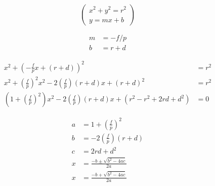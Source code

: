 \documentclass{article}
\begin{document}
\[ %
\begin{pmatrix}
x^2 + y^2 = r^2 \\
y = mx + b
\end{pmatrix}
\]

\[ %
\begin{aligned}
m &= -f/p \\
b &= r + d
\end{aligned}
\]

\[ %
\begin{aligned}
x^2 + \left(-\frac{f}{p}x + (r + d)\right)^2 &= r^2 \\
x^2 + \left(\frac{f}{p}\right)^2 x^2 - 2\left(\frac{f}{p}\right)(r + d)x +
  (r + d)^2 &= r^2 \\
\left(1 + \left(\frac{f}{p}\right)^2\right)x^2 -
  2\left(\frac{f}{p}\right)(r + d)x +
  (r^2 - r^2 + 2rd + d^2) &= 0
\end{aligned}
\]

\[ %
\begin{aligned}
a &= 1 + \left(\frac{f}{p}\right)^2 \\
b &= -2\left(\frac{f}{p}\right)(r + d) \\
c &= 2rd + d^2 \\
x &= \frac{-b \pm \sqrt{b^2 - 4ac}}{2a} \\
x &= \frac{-b + \sqrt{b^2 - 4ac}}{2a}
\end{aligned}
\]
\end{document}
